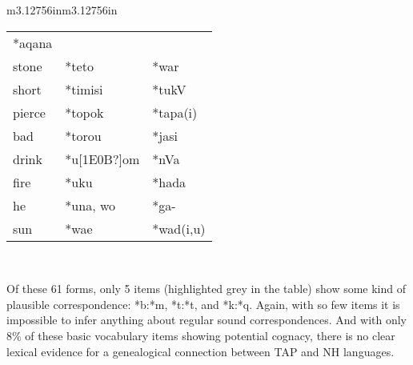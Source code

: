 \begin{center}
\begin{supertabular}{m{3.12756in}m{3.12756in}}
\begin{flushleft}
\begin{tabular}{m{0.69835985in}m{-0.0134401545in}m{0.76435983in}m{-0.031540155in}m{0.7170598in}}
*aqana {\ddag}\\
stone &
\multicolumn{3}{m{0.87685984in}}{*teto} &
*war\\
short &
\multicolumn{3}{m{0.87685984in}}{*timisi} &
*tukV {\ddag}\\
pierce &
\multicolumn{3}{m{0.87685984in}}{*topok} &
*tapa(i)\\
bad &
\multicolumn{3}{m{0.87685984in}}{*torou} &
*jasi {\ddag}\\
drink &
\multicolumn{3}{m{0.87685984in}}{*u[1E0B?]om} &
*nVa\\
fire &
\multicolumn{3}{m{0.87685984in}}{*uku} &
*hada\\
he &
\multicolumn{3}{m{0.87685984in}}{*una, wo} &
*ga- {\ddag}\\
sun &
\multicolumn{3}{m{0.87685984in}}{*wa{\ng}e} &
*wad(i,u)\\
\end{tabular}
\end{flushleft}
\\
\end{supertabular}
\end{center}
\addtocounter{footnote}{-2}
Of these 61 forms, only 5 items (highlighted grey in the table) show some kind of plausible correspondence: *b:*m, *t:*t, and *k:*q. Again, with so few items it is impossible to infer anything about regular sound correspondences. And with only 8\% of these basic vocabulary items showing potential cognacy, there is no clear lexical evidence for a genealogical connection between TAP and NH languages.

